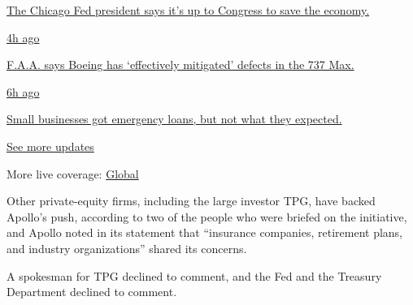 \href{https://www.nytimes.com/live/2020/08/03/business/stock-market-today-coronavirus?action=click\&pgtype=Article\&state=default\&region=MAIN_CONTENT_1\&context=storylines_live_updates\#the-chicago-fed-president-says-its-up-to-congress-to-save-the-economy}{The
Chicago Fed president says it's up to Congress to save the economy.}

\href{https://www.nytimes.com/live/2020/08/03/business/stock-market-today-coronavirus?action=click\&pgtype=Article\&state=default\&region=MAIN_CONTENT_1\&context=storylines_live_updates\#faa-says-boeing-has-effectively-mitigated-defects-in-the-737-max}{4h
ago}

\href{https://www.nytimes.com/live/2020/08/03/business/stock-market-today-coronavirus?action=click\&pgtype=Article\&state=default\&region=MAIN_CONTENT_1\&context=storylines_live_updates\#faa-says-boeing-has-effectively-mitigated-defects-in-the-737-max}{F.A.A.
says Boeing has `effectively mitigated' defects in the 737 Max.}

\href{https://www.nytimes.com/live/2020/08/03/business/stock-market-today-coronavirus?action=click\&pgtype=Article\&state=default\&region=MAIN_CONTENT_1\&context=storylines_live_updates\#small-businesses-got-emergency-loans-but-not-what-they-expected}{6h
ago}

\href{https://www.nytimes.com/live/2020/08/03/business/stock-market-today-coronavirus?action=click\&pgtype=Article\&state=default\&region=MAIN_CONTENT_1\&context=storylines_live_updates\#small-businesses-got-emergency-loans-but-not-what-they-expected}{Small
businesses got emergency loans, but not what they expected.}

\href{https://www.nytimes.com/live/2020/08/03/business/stock-market-today-coronavirus?action=click\&pgtype=Article\&state=default\&region=MAIN_CONTENT_1\&context=storylines_live_updates}{See
more updates}

More live coverage:
\href{https://www.nytimes.com/2020/08/03/world/coronavirus-covid-19.html?action=click\&pgtype=Article\&state=default\&region=MAIN_CONTENT_1\&context=storylines_live_updates}{Global}

Other private-equity firms, including the large investor TPG, have
backed Apollo's push, according to two of the people who were briefed on
the initiative, and Apollo noted in its statement that ``insurance
companies, retirement plans, and industry organizations'' shared its
concerns.

A spokesman for TPG declined to comment, and the Fed and the Treasury
Department declined to comment.

